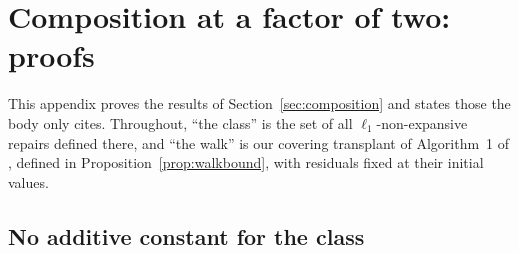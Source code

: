 
\section{Composition at a factor of two: proofs}\label{app:dichotomy}

This appendix proves the results of Section~\ref{sec:composition} and states those the body only
cites. Throughout, ``the class'' is the set of all $\ell_1$-non-expansive repairs defined there,
and ``the walk'' is our covering transplant of Algorithm~1 of \citet{dinitz2021}, defined in
Proposition~\ref{prop:walkbound}, with residuals fixed at their initial values.

\subsection{No additive constant for the class}

